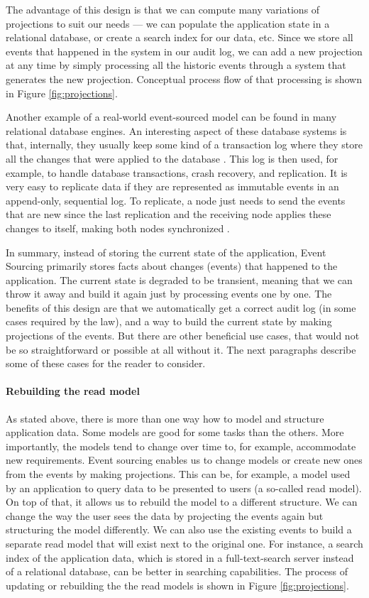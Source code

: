 \documentclass{book}
\begin{document}
The advantage of this design is that we can compute many variations of
projections to suit our needs --- we can populate the application state
in a relational database, or create a search index for our data, etc.
Since we store all events that happened in the system in our audit log,
we can add a new projection at any time by simply processing all the
historic events through a system that generates the new projection.
Conceptual process flow of that processing is shown in Figure
\ref{fig:projections}.

Another example of a real-world event-sourced model can be found in many
relational database engines. An interesting aspect of these database
systems is that, internally, they usually keep some kind of a
transaction log where they store all the changes that were applied to
the database \cite{cqrsnu-eventsourcing}. This log is then used, for
example, to handle database transactions, crash recovery, and
replication. It is very easy to replicate data if they are represented
as immutable events in an append-only, sequential log. To replicate, a
node just needs to send the events that are new since the last
replication and the receiving node applies these changes to itself,
making both nodes synchronized \cite{replica}.

In summary, instead of storing the current state of the application,
Event Sourcing primarily stores facts about changes (events) that
happened to the application. The current state is degraded to be
transient, meaning that we can throw it away and build it again just by
processing events one by one. The benefits of this design are that we
automatically get a correct audit log (in some cases required by the
law), and a way to build the current state by making projections of the
events. But there are other beneficial use cases, that would not be so
straightforward or possible at all without it. The next paragraphs
describe some of these cases for the reader to consider.


\paragraph{Rebuilding the read model}\label{rebuilding-the-read-model}

As stated above, there is more than one way how to model and structure
application data. Some models are good for some tasks than the others.
More importantly, the models tend to change over time to, for example,
accommodate new requirements. Event sourcing enables us to change models
or create new ones from the events by making projections. This can be,
for example, a model used by an application to query data to be
presented to users (a so-called read model). On top of that, it allows
us to rebuild the model to a different structure. We can change the way
the user sees the data by projecting the events again but structuring
the model differently. We can also use the existing events to build a
separate read model that will exist next to the original one. For
instance, a search index of the application data, which is stored in a
full-text-search server instead of a relational database, can be better
in searching capabilities. The process of updating or rebuilding the the
read models is shown in Figure \ref{fig:projections}.
\end{document}
